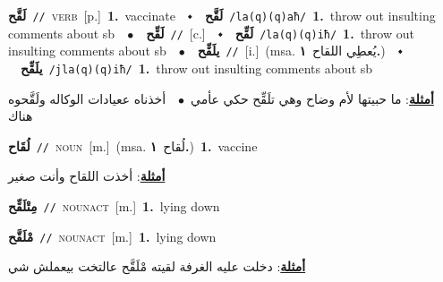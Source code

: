 \documentclass[10pt,a4paper,twoside]{article} %
\begin{document}
\begin{multicols}{2}
{\setlength\topsep{0pt}\textbf{\foreignlanguage{arabic}{لَقَّح}}\ {\color{gray}\texttt{//}\color{black}}\ \textsc{verb}\ [p.]\ \textbf{1.}~vaccinate\ \ $\smblkdiamond$\ \ \setlength\topsep{0pt}\textbf{\foreignlanguage{arabic}{لَقَّح}}\ {\color{gray}\texttt{/la(q)(q)aħ/}\color{black}}\ \textbf{1.}~throw out insulting comments about sb\ \ $\bullet$\ \ \setlength\topsep{0pt}\textbf{\foreignlanguage{arabic}{لَقِّح}}\ {\color{gray}\texttt{//}\color{black}}\ [c.]\ \ $\smblkdiamond$\ \ \setlength\topsep{0pt}\textbf{\foreignlanguage{arabic}{لَقِّح}}\ {\color{gray}\texttt{/la(q)(q)iħ/}\color{black}}\ \textbf{1.}~throw out insulting comments about sb\ \ $\bullet$\ \ \setlength\topsep{0pt}\textbf{\foreignlanguage{arabic}{يلَقِّح}}\ {\color{gray}\texttt{//}\color{black}}\ [i.]\ \color{gray}(msa. \foreignlanguage{arabic}{يُعطِي اللقاح}~\foreignlanguage{arabic}{\textbf{١.}})\color{black}\ \ $\smblkdiamond$\ \ \setlength\topsep{0pt}\textbf{\foreignlanguage{arabic}{يلَقِّح}}\ {\color{gray}\texttt{/jla(q)(q)iħ/}\color{black}}\ \textbf{1.}~throw out insulting comments about sb\  \begin{flushright}\color{gray}\foreignlanguage{arabic}{\textbf{\underline{\foreignlanguage{arabic}{أمثلة}}}: ما حبيتها لأم وضاح وهي تلَقِّح حكي عأمي\ $\bullet$\ \  أخذناه ععيادات الوكاله ولَقَّحوه هناك}\end{flushright}\color{black}} \vspace{2mm}

{\setlength\topsep{0pt}\textbf{\foreignlanguage{arabic}{لُقَاح}}\ {\color{gray}\texttt{//}\color{black}}\ \textsc{noun}\ [m.]\ \color{gray}(msa. \foreignlanguage{arabic}{لُقاح}~\foreignlanguage{arabic}{\textbf{١.}})\color{black}\ \textbf{1.}~vaccine\  \begin{flushright}\color{gray}\foreignlanguage{arabic}{\textbf{\underline{\foreignlanguage{arabic}{أمثلة}}}: أخذت اللقاح وأنت صغير}\end{flushright}\color{black}} \vspace{2mm}

{\setlength\topsep{0pt}\textbf{\foreignlanguage{arabic}{مِتْلَقِّح}}\ {\color{gray}\texttt{//}\color{black}}\ \textsc{noun\textunderscore act}\ [m.]\ \textbf{1.}~lying down\ } \vspace{2mm}

{\setlength\topsep{0pt}\textbf{\foreignlanguage{arabic}{مْلَقَّح}}\ {\color{gray}\texttt{//}\color{black}}\ \textsc{noun\textunderscore act}\ [m.]\ \textbf{1.}~lying down\  \begin{flushright}\color{gray}\foreignlanguage{arabic}{\textbf{\underline{\foreignlanguage{arabic}{أمثلة}}}: دخلت عليه الغرفة لقيته مْلَقَّح عالتخت بيعملش شي}\end{flushright}\color{black}} \vspace{2mm}


\end{multicols}
\end{document}
